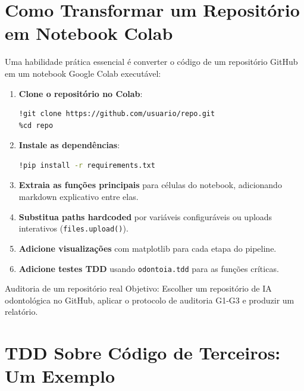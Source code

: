 \section{Como Transformar um Repositório em Notebook Colab}

Uma habilidade prática essencial é converter o código de um repositório
GitHub em um notebook Google Colab executável:

\begin{enumerate}
  \item \textbf{Clone o repositório no Colab}:
\begin{lstlisting}[language=bash]
!git clone https://github.com/usuario/repo.git
%cd repo
\end{lstlisting}

  \item \textbf{Instale as dependências}:
\begin{lstlisting}[language=bash]
!pip install -r requirements.txt
\end{lstlisting}

  \item \textbf{Extraia as funções principais} para células do notebook,
    adicionando markdown explicativo entre elas.

  \item \textbf{Substitua paths hardcoded} por variáveis configuráveis
    ou uploads interativos (\texttt{files.upload()}).

  \item \textbf{Adicione visualizações} com matplotlib para cada etapa
    do pipeline.

  \item \textbf{Adicione testes TDD} usando \texttt{odontoia.tdd} para
    as funções críticas.
\end{enumerate}

\begin{pratica}{Auditoria de um repositório real}
  Objetivo: Escolher um repositório de IA odontológica no GitHub, aplicar
  o protocolo de auditoria G1-G3 e produzir um relatório.
\end{pratica}



\section{TDD Sobre Código de Terceiros: Um Exemplo}

